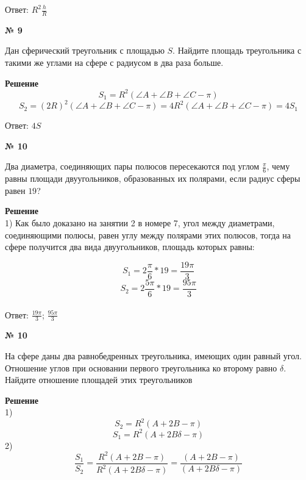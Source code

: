     Ответ: $R^2\frac{h}{R}$

    \begin{center}
        \textbf{№ 9}
    \end{center}

    Дан сферический треугольник с площадью $S$.
    Найдите площадь треугольника с такими же углами на сфере с радиусом в два раза больше.

    \textbf{Решение}\\

    \[
        S_1 = R^2(\angle A + \angle B + \angle C - \pi)
    \]
    \[
        S_2 = (2R)^2(\angle A + \angle B + \angle C - \pi) = 4R^2(\angle A + \angle B + \angle C - \pi) = 4S_1
    \]

    Ответ: $4S$

    \begin{center}
        \textbf{№ 10}
    \end{center}

    Два диаметра, соединяющих пары полюсов пересекаются под углом $\frac{\pi}{6}$,
    чему равны площади двуугольников, образованных их полярами, если радиус сферы равен $19$?

    \textbf{Решение}\\

    1) Как было доказано на занятии 2 в номере 7, угол между диаметрами, соединяющими полюсы,
    равен углу между полярами этих полюсов, тогда на сфере получится два вида двуугольников,
    площадь которых равны:

    \[
        S_1 = 2\frac{\pi}{6} * 19 = \frac{19\pi}{3}
    \]
    \[
        S_2 = 2\frac{5\pi}{6} * 19 = \frac{95\pi}{3}
    \]\\

    Ответ: $\frac{19\pi}{3}$; $\frac{95\pi}{3}$








    \begin{center}
        \textbf{№ 10}
    \end{center}

    На сфере даны два равнобедренных треугольника, имеющих один равный угол.
    Отношение углов при основании первого треугольника ко второму равно $\delta$.
    Найдите отношение площадей этих треугольников

    \textbf{Решение}\\

    1)
    \[
        S_2 = R ^ 2(A + 2B - \pi)
    \]
    \[
        S_1 = R^2(A + 2B\delta - \pi)
    \]
    2)
    \[
        \frac{S_1}{S_2} = \frac{R ^ 2(A + 2B - \pi)}{R ^ 2(A + 2B\delta - \pi)} = \frac{(A + 2B - \pi)}{(A + 2B\delta - \pi)}
    \]

